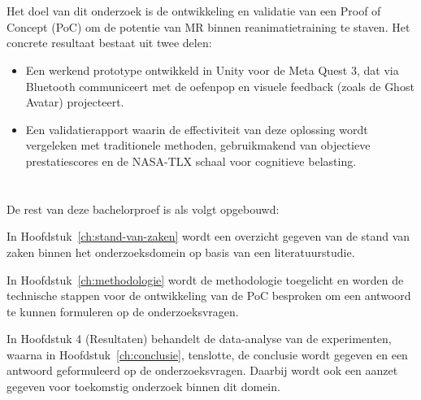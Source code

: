 \section{}%
\label{sec:onderzoeksdoelstelling}

Het doel van dit onderzoek is de ontwikkeling en validatie van een Proof of Concept (PoC) om de potentie van MR binnen reanimatietraining te staven. Het concrete resultaat bestaat uit twee delen:
\begin{itemize}
    \item Een werkend prototype ontwikkeld in Unity voor de Meta Quest 3, dat via Bluetooth communiceert met de oefenpop en visuele feedback (zoals de Ghost Avatar) projecteert.
    \item Een validatierapport waarin de effectiviteit van deze oplossing wordt vergeleken met traditionele methoden, gebruikmakend van objectieve prestatiescores en de NASA-TLX schaal voor cognitieve belasting.
\end{itemize}

\section{}%
\label{sec:opzet-bachelorproef}

De rest van deze bachelorproef is als volgt opgebouwd:

In Hoofdstuk~\ref{ch:stand-van-zaken} wordt een overzicht gegeven van de stand van zaken binnen het onderzoeksdomein op basis van een literatuurstudie.

In Hoofdstuk~\ref{ch:methodologie} wordt de methodologie toegelicht en worden de technische stappen voor de ontwikkeling van de PoC besproken om een antwoord te kunnen formuleren op de onderzoeksvragen.

In Hoofdstuk 4 (Resultaten) behandelt de data-analyse van de experimenten, waarna in Hoofdstuk~\ref{ch:conclusie}, tenslotte, de conclusie wordt gegeven en een antwoord geformuleerd op de onderzoeksvragen. 
Daarbij wordt ook een aanzet gegeven voor toekomstig onderzoek binnen dit domein.